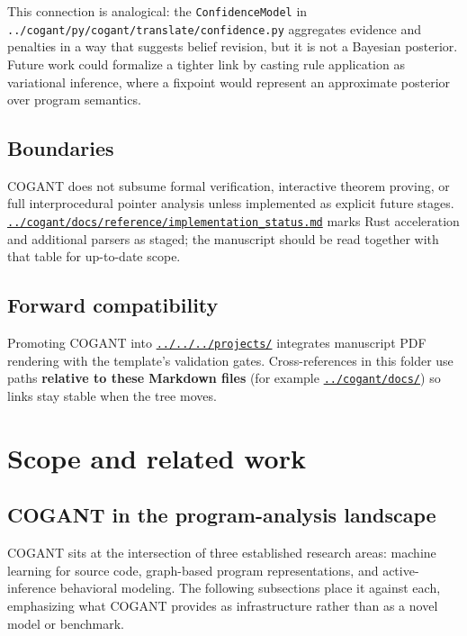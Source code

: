 \documentclass[
]{article}
\begin{document}
This connection is analogical: the \texttt{ConfidenceModel} in
\texttt{../cogant/py/cogant/translate/confidence.py} aggregates evidence
and penalties in a way that suggests belief revision, but it is not a
Bayesian posterior. Future work could formalize a tighter link by
casting rule application as variational inference, where a fixpoint
would represent an approximate posterior over program semantics.

\subsection{Boundaries}\label{boundaries}

COGANT does not subsume formal verification, interactive theorem
proving, or full interprocedural pointer analysis unless implemented as
explicit future stages.
\href{../cogant/docs/reference/implementation_status.md}{\texttt{../cogant/docs/reference/implementation\_status.md}}
marks Rust acceleration and additional parsers as staged; the manuscript
should be read together with that table for up-to-date scope.

\subsection{Forward compatibility}\label{forward-compatibility}

Promoting COGANT into
\href{../../../projects/}{\texttt{../../../projects/}} integrates
manuscript PDF rendering with the template's validation gates.
Cross-references in this folder use paths \textbf{relative to these
Markdown files} (for example
\href{../cogant/docs/}{\texttt{../cogant/docs/}}) so links stay stable
when the tree moves.

\newpage

\section{Scope and related work}\label{scope-and-related-work}

\subsection{COGANT in the program-analysis
landscape}\label{cogant-in-the-program-analysis-landscape-1}

COGANT sits at the intersection of three established research areas:
machine learning for source code, graph-based program representations,
and active-inference behavioral modeling. The following subsections
place it against each, emphasizing what COGANT provides as
infrastructure rather than as a novel model or benchmark.
\end{document}

